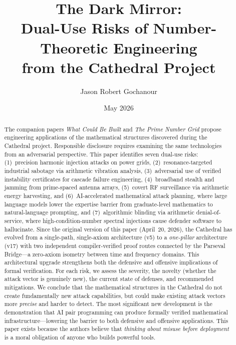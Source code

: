 \documentclass[11pt,a4paper]{article}
\title{%
  The Dark Mirror:\\
  Dual-Use Risks of Number-Theoretic Engineering\\
  from the Cathedral Project%
}
\author{
  Jason Robert Gochanour
}
\date{May 2026}
\begin{document}
\maketitle

\begin{abstract}
The companion papers \emph{What Could Be Built} and \emph{The
Prime Number Grid} propose engineering applications of the
mathematical structures discovered during the Cathedral project.
Responsible disclosure requires examining the same technologies
from an adversarial perspective. This paper identifies seven
dual-use risks: (1)~precision harmonic injection attacks on power
grids, (2)~resonance-targeted industrial sabotage via arithmetic
vibration analysis, (3)~adversarial use of verified instability
certificates for cascade failure engineering, (4)~broadband stealth
and jamming from prime-spaced antenna arrays, (5)~covert RF
surveillance via arithmetic energy harvesting, and
(6)~AI-accelerated mathematical attack planning, where large
language models lower the expertise barrier from graduate-level
mathematics to natural-language prompting, and
(7)~algorithmic blinding via arithmetic denial-of-service,
where high-condition-number spectral injections cause
defender software to hallucinate.
Since the original version of this paper (April~20, 2026),
the Cathedral has evolved from a single-path, single-axiom
architecture (v5) to a \emph{one-pillar} architecture (v17) with
two independent compiler-verified proof routes connected by the
Parseval Bridge---a zero-axiom isometry between time and frequency
domains. This architectural upgrade strengthens both the defensive
and offensive implications of formal verification.
For each risk, we
assess the severity, the novelty (whether the attack vector is
genuinely new), the current state of defenses, and recommended
mitigations. We conclude that the mathematical structures in the
Cathedral do not create fundamentally new attack capabilities, but
could make existing attack vectors more \emph{precise} and harder
to detect. The most significant new development is the
demonstration that AI pair programming can produce formally verified
mathematical infrastructure---lowering the barrier to both
defensive and offensive applications.
This paper exists because the authors believe
that \emph{thinking about misuse before deployment} is a moral
obligation of anyone who builds powerful tools.
\end{abstract}

\tableofcontents

\end{document}
